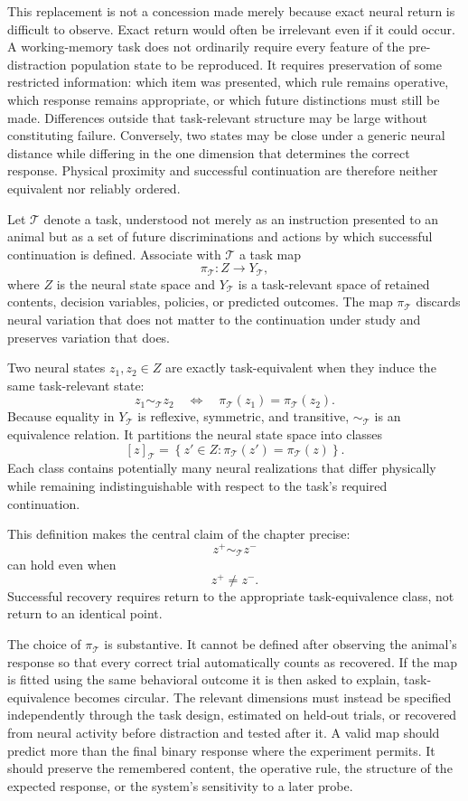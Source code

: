\documentclass[11pt]{book}
\begin{document}
This replacement is not a concession made merely because exact neural return is difficult to observe. Exact return would often be irrelevant even if it could occur. A working-memory task does not ordinarily require every feature of the pre-distraction population state to be reproduced. It requires preservation of some restricted information: which item was presented, which rule remains operative, which response remains appropriate, or which future distinctions must still be made. Differences outside that task-relevant structure may be large without constituting failure. Conversely, two states may be close under a generic neural distance while differing in the one dimension that determines the correct response. Physical proximity and successful continuation are therefore neither equivalent nor reliably ordered.

Let $\mathcal T$ denote a task, understood not merely as an instruction presented to an animal but as a set of future discriminations and actions by which successful continuation is defined. Associate with $\mathcal T$ a task map
\[
\pi_{\mathcal T}:Z\longrightarrow Y_{\mathcal T},
\]
where $Z$ is the neural state space and $Y_{\mathcal T}$ is a task-relevant space of retained contents, decision variables, policies, or predicted outcomes. The map $\pi_{\mathcal T}$ discards neural variation that does not matter to the continuation under study and preserves variation that does.

Two neural states $z_1,z_2\in Z$ are exactly task-equivalent when they induce the same task-relevant state:
\[
z_1\sim_{\mathcal T}z_2
\quad\Longleftrightarrow\quad
\pi_{\mathcal T}(z_1)=\pi_{\mathcal T}(z_2).
\]
Because equality in $Y_{\mathcal T}$ is reflexive, symmetric, and transitive, $\sim_{\mathcal T}$ is an equivalence relation. It partitions the neural state space into classes
\[
[z]_{\mathcal T}
=
\left\{
z'\in Z:
\pi_{\mathcal T}(z')=\pi_{\mathcal T}(z)
\right\}.
\]
Each class contains potentially many neural realizations that differ physically while remaining indistinguishable with respect to the task's required continuation.

This definition makes the central claim of the chapter precise:
\[
z^{+}\sim_{\mathcal T}z^{-}
\]
can hold even when
\[
z^{+}\neq z^{-}.
\]
Successful recovery requires return to the appropriate task-equivalence class, not return to an identical point.

The choice of $\pi_{\mathcal T}$ is substantive. It cannot be defined after observing the animal's response so that every correct trial automatically counts as recovered. If the map is fitted using the same behavioral outcome it is then asked to explain, task-equivalence becomes circular. The relevant dimensions must instead be specified independently through the task design, estimated on held-out trials, or recovered from neural activity before distraction and tested after it. A valid map should predict more than the final binary response where the experiment permits. It should preserve the remembered content, the operative rule, the structure of the expected response, or the system's sensitivity to a later probe.
\end{document}
